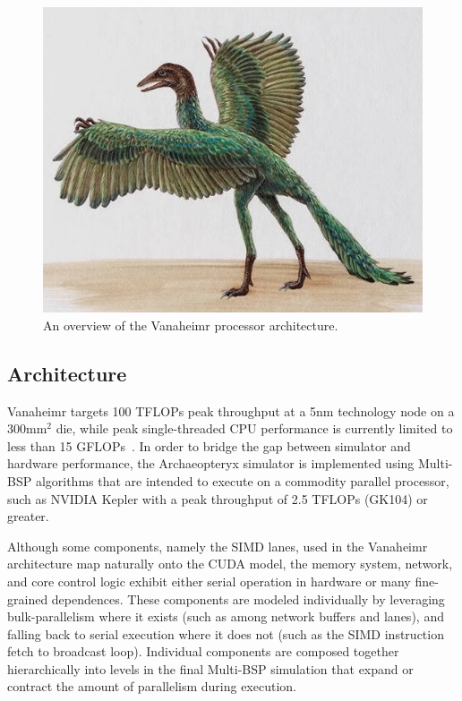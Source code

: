 \documentclass[conference, 10pt]{IEEEtran}
\begin{document}
\begin{figure}
	\begin{center}
		\includegraphics[width=0.9\linewidth]{archaeopteryx-bird}
		\caption{An overview of the Vanaheimr processor architecture.}
		\label{fig:vanaheimr}
	\end{center}
\end{figure}

\subsection{Architecture}
Vanaheimr targets 100 TFLOPs peak throughput at a 5nm technology node on a
300mm$^2$ die, while peak single-threaded CPU performance is currently limited
to less than 15 GFLOPs~\cite{ref:sandybridge-peak}.  In order to bridge the gap
between simulator and hardware performance, the Archaeopteryx simulator is
implemented using Multi-BSP algorithms that are intended to execute on a
commodity parallel processor, such as NVIDIA Kepler with a peak throughput of
2.5 TFLOPs (GK104) or greater.

Although some components, namely the SIMD lanes, used in the Vanaheimr
architecture map naturally onto the CUDA model, the memory system, network,
and core control logic exhibit either serial operation in hardware or many
fine-grained dependences.  These components are modeled individually by
leveraging bulk-parallelism where it exists (such as among network buffers and
lanes), and falling back to serial execution where it does not (such as the
SIMD instruction fetch to broadcast loop). Individual components are composed 
together hierarchically into levels in the final Multi-BSP simulation that
expand or contract the amount of parallelism during execution.  
\end{document}

